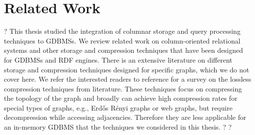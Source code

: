\chapter{Related Work}
\label{c:related-works}
?
This thesis studied the integration of columnar storage and query processing techniques to GDBMSs. We review related work on column-oriented relational systems and other storage and compression techniques that have been designed for GDBMSs and RDF engines. There is an extensive literature on different storage and compression techniques designed for specific graphs, which we do not cover here. We refer the interested readers to reference \cite{sahu:survey, besta2018survey} for a survey on the lossless compression techniques from literature. These techniques focus on compressing the topology of the graph and broadly can achieve high compression rates for special types of graphs, e.g., Erd\H{o}s R\'enyi graphs or web graphs, but require decompression while accessing adjacencies. Therefore they are less applicable for an in-memory GDBMS that the techniques we considered in this thesis.
?
?
